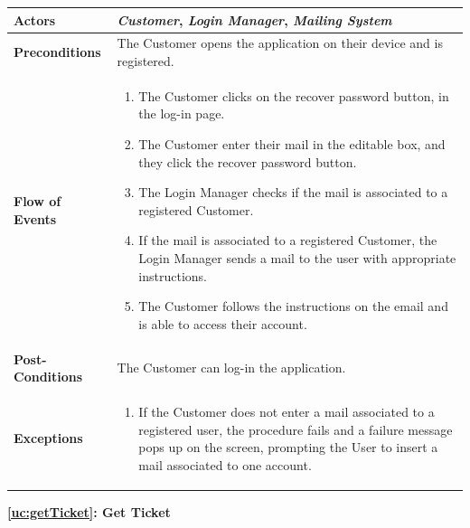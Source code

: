 \documentclass[a4paper, 12pt, oneside]{article}
\begin{document}
\begin{enumerate}[labelindent=20pt, label={UC.\arabic*}, itemindent=1em,leftmargin=!]
\begin{tabularx}{\linewidth}{| l | X |}

    \hline
    \textbf{Actors} & \textbf{\textit{Customer}}, \textit{\textbf{Login Manager}}, \textit{\textbf{Mailing System}} \\
    
    \hline
    \textbf{Preconditions} & The Customer opens the application on their device and is registered.\\
    
    \hline
    \textbf{Flow of Events} & \parbox{0.7\textwidth}{   
        \begin{enumerate}
            \item The Customer clicks on the recover password button, in the log-in page.
            \item The Customer enter their mail in the editable box, and they click the recover password button.
            \item The Login Manager checks if the mail is associated to a registered Customer.
            \item If the mail is associated to a registered Customer, the Login Manager sends a mail to the user with appropriate instructions.
            \item The Customer follows the instructions on the email and is able to access their account.
    \end{enumerate}}\\
    
    \hline
    \textbf{Post-Conditions} & The Customer can log-in the application.\\
    
    \hline
    \textbf{Exceptions} & \parbox{0.7\textwidth}{ \begin{enumerate}
            \item If the Customer does not enter a mail associated to a registered user, the procedure fails and a failure message pops up on the screen, prompting the User to insert a mail associated to one account.
        \end{enumerate}}\\

    \hline
    
\end{tabularx}

\begin{center}
{\textbf{\ref{uc:getTicket}: Get Ticket}}
\end{center}
\begin{tabularx}{\linewidth}{| l | X |}
    

\end{tabularx}
\end{enumerate}
\end{document}
